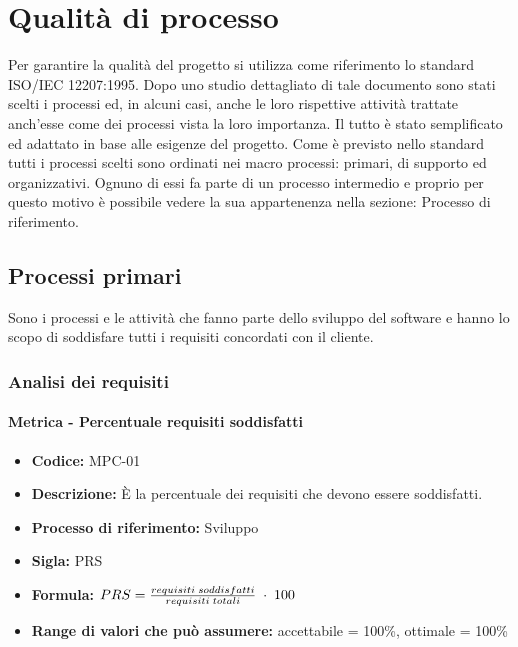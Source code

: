 \section{Qualità di processo}
Per garantire la qualità del progetto si utilizza come riferimento lo standard ISO/IEC 12207:1995. Dopo uno studio dettagliato di tale documento sono stati scelti i processi
ed, in alcuni casi, anche le loro rispettive attività trattate anch'esse come dei processi vista la loro importanza. Il tutto è stato semplificato ed adattato in base alle 
esigenze del progetto. Come è previsto nello standard tutti i processi scelti sono ordinati nei macro processi: primari, di supporto ed organizzativi. Ognuno di essi fa parte 
di un processo intermedio e proprio per questo motivo è possibile vedere la sua appartenenza nella sezione: Processo di riferimento.

\subsection{Processi primari}
Sono i processi e le attività che fanno parte dello sviluppo del software e hanno lo scopo di soddisfare tutti i requisiti concordati con il cliente.

\subsubsection{Analisi dei requisiti}
    \paragraph{Metrica - Percentuale requisiti soddisfatti}
    \begin{itemize}
        \item \textbf{Codice:} MPC-01
        \item \textbf{Descrizione:} È la percentuale dei requisiti che devono essere soddisfatti.
        \item \textbf{Processo di riferimento:} Sviluppo
        \item \textbf{Sigla:} PRS
        \item \textbf{Formula:} \begin{math}{PRS = {requisiti \; soddisfatti \over requisiti \; totali}\; \cdot \; 100}\end{math}
        \item \textbf{Range di valori che può assumere:} accettabile = 100\%, ottimale = 100\% 
    \end{itemize}

